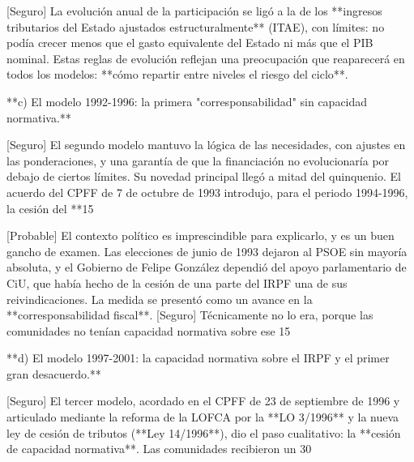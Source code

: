 \documentclass[10pt,a4paper]{article}
\begin{document}
[Seguro] La evolución anual de la participación se ligó a la de los **ingresos tributarios del Estado ajustados estructuralmente** (ITAE), con límites: no podía crecer menos que el gasto equivalente del Estado ni más que el PIB nominal. Estas reglas de evolución reflejan una preocupación que reaparecerá en todos los modelos: **cómo repartir entre niveles el riesgo del ciclo**.

**c) El modelo 1992-1996: la primera "corresponsabilidad" sin capacidad normativa.**

[Seguro] El segundo modelo mantuvo la lógica de las necesidades, con ajustes en las ponderaciones, y una garantía de que la financiación no evolucionaría por debajo de ciertos límites. Su novedad principal llegó a mitad del quinquenio. El acuerdo del CPFF de 7 de octubre de 1993 introdujo, para el periodo 1994-1996, la cesión del **15%

[Probable] El contexto político es imprescindible para explicarlo, y es un buen gancho de examen. Las elecciones de junio de 1993 dejaron al PSOE sin mayoría absoluta, y el Gobierno de Felipe González dependió del apoyo parlamentario de CiU, que había hecho de la cesión de una parte del IRPF una de sus reivindicaciones. La medida se presentó como un avance en la **corresponsabilidad fiscal**. [Seguro] Técnicamente no lo era, porque las comunidades no tenían capacidad normativa sobre ese 15%

**d) El modelo 1997-2001: la capacidad normativa sobre el IRPF y el primer gran desacuerdo.**

[Seguro] El tercer modelo, acordado en el CPFF de 23 de septiembre de 1996 y articulado mediante la reforma de la LOFCA por la **LO 3/1996** y la nueva ley de cesión de tributos (**Ley 14/1996**), dio el paso cualitativo: la **cesión de capacidad normativa**. Las comunidades recibieron un 30%
\end{document}

